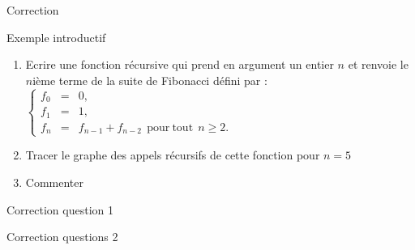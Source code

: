 \documentclass[10pt]{beamer}
\begin{document}
\begin{frame}[fragile]{\Ctitle}{\stitle}
	\begin{exampleblock}{Correction}
	\end{exampleblock}
\end{frame}


\begin{frame}{\Ctitle}{\stitle}
	\begin{exampleblock}{Exemple introductif}
		\begin{enumerate}
			\item<1-> Ecrire une fonction récursive qui prend en argument un entier $n$ et renvoie le $n$ième terme de la suite de Fibonacci défini par :
				$\left\{ \begin{array}{lll}
						f_0   & = & 0,                                                  \\
						f_1   & = & 1,                                                  \\
						f_{n} & = & f_{n-1}+f_{n-2} \mathrm{\ \ pour\ tout\ \ } n\geq2.\end{array} \right.$
			\item<2-> Tracer le graphe des appels récursifs de cette fonction pour $n=5$
			\item<3-> Commenter
		\end{enumerate}
	\end{exampleblock}
\end{frame}



\begin{frame}{\Ctitle}{\stitle}
	\begin{exampleblock}{Correction question 1}
	\end{exampleblock}
\end{frame}

\begin{frame}{\Ctitle}{\stitle}
	\begin{exampleblock}{Correction questions 2}
		\begin{center}
		\end{center}
	\end{exampleblock}
\end{frame}
\end{document}
